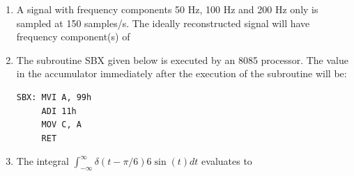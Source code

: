 \documentclass[journal,12pt,onecolumn]{IEEEtran}
\theoremstyle{remark}
\begin{document}
\begin{enumerate}
\hfill{}
\begin{enumerate} 
 \end{enumerate}


\item A signal with frequency components 50 Hz, 100 Hz and 200 Hz only is sampled at 150 samples/s. The ideally reconstructed signal will have frequency component(s) of

\hfill{}\begin{enumerate}  \end{enumerate}

\item The subroutine SBX given below is executed by an 8085 processor. The value in the accumulator immediately after the execution of the subroutine will be:
\begin{verbatim}
SBX: MVI A, 99h
     ADI 11h
     MOV C, A
     RET
\end{verbatim}

\hfill{}\begin{enumerate}  \end{enumerate}

\vspace{0.5cm}

\item The integral $\int_{-\infty}^{\infty} \delta(t - \pi/6) 6 \sin(t) dt$ evaluates to


\end{enumerate}
\end{document}
